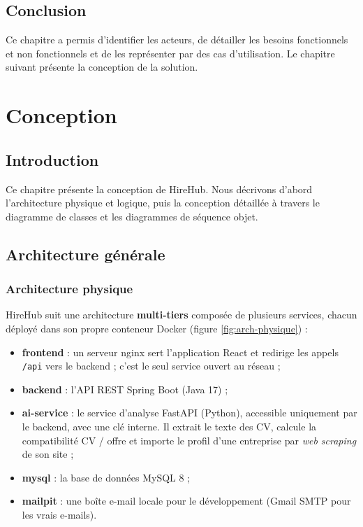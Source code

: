 \documentclass[12pt,a4paper]{report}
\newcommand{\plan}{%
  \begingroup
  \etocsettocstyle{\vspace{1.5cm}\noindent{\large\bfseries Plan}\par\vspace{6pt}}{}%
  \etocsetstyle{section}{}{}%
    {\noindent\hspace*{2em}\makebox[2.5em][l]{\small\bfseries\etocnumber}%
     {\small\bfseries\etocname}\dotfill{\small\bfseries\etocpage}\par}{}%
  \etocsetnexttocdepth{section}%
  \localtableofcontents
  \endgroup
  \clearpage}
\begin{document}
\section*{Conclusion}
Ce chapitre a permis d'identifier les acteurs, de détailler les besoins fonctionnels et non fonctionnels et de les représenter par des cas d'utilisation. Le chapitre suivant présente la conception de la solution.

\chapter{Conception}
\plan

\section*{Introduction}
Ce chapitre présente la conception de HireHub. Nous décrivons d'abord l'architecture physique et logique, puis la conception détaillée à travers le diagramme de classes et les diagrammes de séquence objet.

\section{Architecture générale}

\subsection{Architecture physique}
HireHub suit une architecture \textbf{multi-tiers} composée de plusieurs services, chacun déployé dans son propre conteneur Docker (figure \ref{fig:arch-physique}) :
\begin{itemize}
  \item \textbf{frontend} : un serveur nginx sert l'application React et redirige les appels \texttt{/api} vers le backend ; c'est le seul service ouvert au réseau ;
  \item \textbf{backend} : l'API REST Spring Boot (Java 17) ;
  \item \textbf{ai-service} : le service d'analyse FastAPI (Python), accessible uniquement par le backend, avec une clé interne. Il extrait le texte des CV, calcule la compatibilité CV / offre et importe le profil d'une entreprise par \emph{web scraping} de son site ;
  \item \textbf{mysql} : la base de données MySQL 8 ;
  \item \textbf{mailpit} : une boîte e-mail locale pour le développement (Gmail SMTP pour les vrais e-mails).
\end{itemize}
\end{document}

